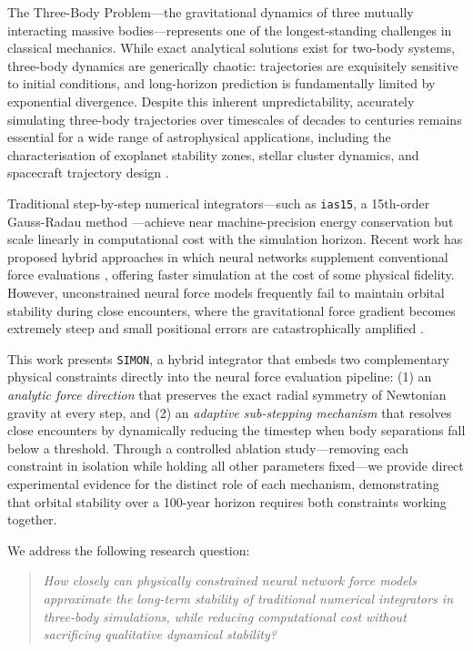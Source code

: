 \documentclass[12pt]{article}
\begin{document}
The Three-Body Problem---the gravitational dynamics of three mutually interacting
massive bodies---represents one of the longest-standing challenges in classical
mechanics. While exact analytical solutions exist for two-body systems, three-body
dynamics are generically chaotic: trajectories are exquisitely sensitive to initial
conditions, and long-horizon prediction is fundamentally limited by exponential
divergence. Despite this inherent unpredictability, accurately simulating three-body
trajectories over timescales of decades to centuries remains essential for a wide
range of astrophysical applications, including the characterisation of exoplanet
stability zones, stellar cluster dynamics, and spacecraft trajectory design
\citep{gardner2006james}.

Traditional step-by-step numerical integrators---such as \texttt{ias15}, a 15th-order
Gauss-Radau method \citep{Rein_2014}---achieve near machine-precision energy conservation
but scale linearly in computational cost with the simulation horizon. Recent work has
proposed hybrid approaches in which neural networks supplement conventional force
evaluations \citep{ulibarrena2024hybrid}, offering faster simulation at the cost of
some physical fidelity. However, unconstrained neural force models frequently fail to
maintain orbital stability during close encounters, where the gravitational force
gradient becomes extremely steep and small positional errors are catastrophically
amplified \citep{Dehnen2001}.

This work presents \texttt{SIMON}, a hybrid integrator that embeds two complementary
physical constraints directly into the neural force evaluation pipeline: (1) an
\emph{analytic force direction} that preserves the exact radial symmetry of Newtonian
gravity at every step, and (2) an \emph{adaptive sub-stepping mechanism} that resolves
close encounters by dynamically reducing the timestep when body separations fall below
a threshold. Through a controlled ablation study---removing each constraint in
isolation while holding all other parameters fixed---we provide direct experimental
evidence for the distinct role of each mechanism, demonstrating that orbital stability
over a 100-year horizon requires both constraints working together.

We address the following research question:

\begin{quote}
\emph{How closely can physically constrained neural network force models approximate
the long-term stability of traditional numerical integrators in three-body simulations,
while reducing computational cost without sacrificing qualitative dynamical stability?}
\end{quote}
\end{document}
